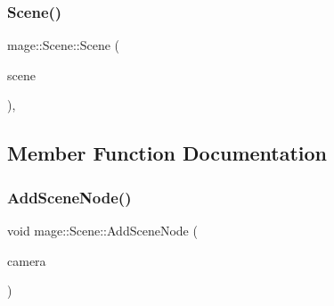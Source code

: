 \hypertarget{classmage_1_1_scene_a35b8fc4242c2348e53014b96416fc3d3}{}\label{classmage_1_1_scene_a35b8fc4242c2348e53014b96416fc3d3} 
\subsubsection{\texorpdfstring{Scene()}{Scene()}\hspace{0.1cm}{\footnotesize\ttfamily [3/3]}}
{\footnotesize\ttfamily mage\+::\+Scene\+::\+Scene (\begin{DoxyParamCaption}\item[{\hyperlink{classmage_1_1_scene}{Scene} \&\&}]{scene }\end{DoxyParamCaption})\hspace{0.3cm}{\ttfamily [protected]}, {\ttfamily [default]}}



\subsection{Member Function Documentation}
\hypertarget{classmage_1_1_scene_a4d7e96e51563f021894800faf6136a24}{}\label{classmage_1_1_scene_a4d7e96e51563f021894800faf6136a24} 
\subsubsection{\texorpdfstring{Add\+Scene\+Node()}{AddSceneNode()}\hspace{0.1cm}{\footnotesize\ttfamily [1/7]}}
{\footnotesize\ttfamily void mage\+::\+Scene\+::\+Add\+Scene\+Node (\begin{DoxyParamCaption}\item[{\hyperlink{namespacemage_a1e01ae66713838a7a67d30e44c67703e}{Shared\+Ptr}$<$ \hyperlink{classmage_1_1_camera_node}{Camera\+Node} $>$}]{camera }\end{DoxyParamCaption})\hspace{0.3cm}{\ttfamily [private]}}

\hypertarget{classmage_1_1_scene_a26209907f771b99f1b3e5750d0a3e6f2}{}\label{classmage_1_1_scene_a26209907f771b99f1b3e5750d0a3e6f2} 
